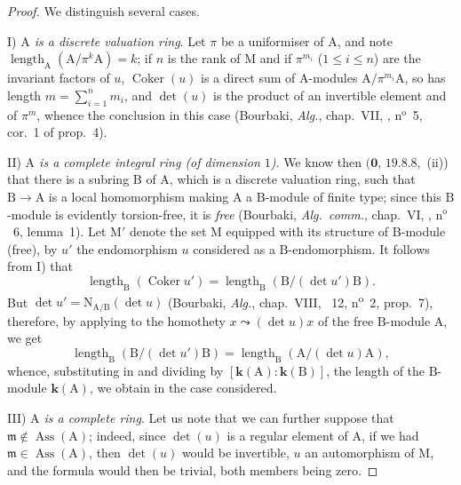 \begin{proof}
We distinguish several cases.

I) \emph{$\mathrm{A}$ is a discrete valuation ring}.
Let $\pi$ be a uniformiser of $\mathrm{A}$, and note $\operatorname{length}_{\mathrm{A}}(\mathrm{A}/\pi^k\mathrm{A})=k$; if $n$ is the rank of $\mathrm{M}$ and if $\pi^{m_i}$ ($1\leq i\leq n$) are the invariant factors of $u$, $\operatorname{Coker}(u)$ is a direct sum of A-modules $\mathrm{A}/\pi^{m_i}\mathrm{A}$, so has length $m=\sum_{i=1}^n m_i$, and $\det(u)$ is the product of an invertible element and of $\pi^m$, whence the conclusion in this case (Bourbaki, \emph{Alg.}, chap.~VII, , n$^{\mathrm{o}}$~5, cor.~1 of prop.~4).

II) \emph{$\mathrm{A}$ is a complete integral ring (of dimension $1$)}.
We know then $(\mathbf{0}$, $19.8.8$,~(ii)) that there is a subring $\mathrm{B}$ of $\mathrm{A}$, which is a discrete valuation ring, such that $\mathrm{B}\to\mathrm{A}$ is a local homomorphism making $\mathrm{A}$ a $\mathrm{B}$-module of finite type; since this $\mathrm{B}$-module is evidently torsion-free, it is \emph{free} (Bourbaki, \emph{Alg.\ comm.}, chap.~VI, , n$^{\mathrm{o}}$~6, lemma~1).
Let $\mathrm{M}'$ denote the set $\mathrm{M}$ equipped with its structure of $\mathrm{B}$-module (free), by $u'$ the endomorphism $u$ considered as a $\mathrm{B}$-endomorphism.
It follows from I) that
\[
\label{IV.21.10.17.5}
  \operatorname{length}_{\mathrm{B}}(\operatorname{Coker} u')=\operatorname{length}_{\mathrm{B}}(\mathrm{B}/(\det u')\mathrm{B}).
  \tag{21.10.17.5}
\]
But $\det u'=\mathrm{N}_{\mathrm{A}/\mathrm{B}}(\det u)$ (Bourbaki, \emph{Alg.}, chap.~VIII, \textsection~12, n\textsuperscript{o}~2, prop.~7), therefore, by applying  to the homothety $x\leadsto(\det u)x$ of the free $\mathrm{B}$-module $\mathrm{A}$, we get
\[
  \operatorname{length}_{\mathrm{B}}(\mathrm{B}/(\det u')\mathrm{B})=\operatorname{length}_{\mathrm{B}}(\mathrm{A}/(\det u)\mathrm{A}),
\]
whence, substituting in  and dividing by $[\boldsymbol{k}(\mathrm{A}):\boldsymbol{k}(\mathrm{B})]$, the length of the $\mathrm{B}$-module $\boldsymbol{k}(\mathrm{A})$, we obtain  in the case considered.

III) \emph{$\mathrm{A}$ is a complete ring}.
Let us note that we can further suppose that $\mathfrak{m}\notin\operatorname{Ass}(\mathrm{A})$; indeed, since $\det(u)$ is a regular element of $\mathrm{A}$, if we had $\mathfrak{m}\in\operatorname{Ass}(\mathrm{A})$, then $\det(u)$ would be invertible, $u$ an automorphism of $\mathrm{M}$, and the formula  would then be trivial, both members being zero.


\end{proof}
